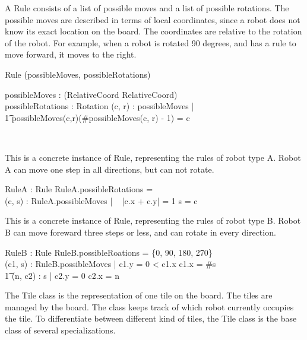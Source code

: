 A Rule consists of a list of possible moves and a list of possible rotations. The possible moves are described in terms of local coordinates, since a robot does not know its exact location on the board. The coordinates are relative to the rotation of the robot. For example, when a robot is rotated 90 degrees, and has a rule to move forward, it moves to the right.
\begin{class}{Rule}
\upharpoonright (possibleMoves, possibleRotations) \\
\begin{state}
possibleMoves : \power (RelativeCoord \pfun \seq RelativeCoord) \\
possibleRotations : \power Rotation
\where
\forall (c, r) : \dom possibleMoves | \\ \t1 possibleMoves(c,r)(\#possibleMoves(c, r) - 1) = c
\end{state} \\
\end{class}
This is a concrete instance of Rule, representing the rules of robot type A. Robot A can move one step in all directions, but can not rotate.
\begin{axdef}
RuleA : Rule
\where
RuleA.possibleRotations = \emptyset \\
\forall (c, s) : RuleA.possibleMoves | ~ |c.x + c.y| = 1 \wedge s = \langle c\rangle
\end{axdef}
This is a concrete instance of Rule, representing the rules of robot type B. Robot B can move foreward three steps or less, and can rotate in every direction.
\begin{axdef}
RuleB : Rule
\where
RuleB.possibleRoations = \{0, 90, 180, 270\} \\
\forall (c1, s) : RuleB.possibleMoves | c1.y = 0  < c1.x  \wedge c1.x = \#s \; \; \wedge \\ \t1 \forall (n, c2) : s | c2.y = 0 \wedge c2.x = n
\end{axdef}

The Tile class is the representation of one tile on the board. The tiles are managed by the board. The class keeps track of which robot currently occupies the tile. To differentiate between different kind of tiles, the Tile class is the base class of several specializations.

